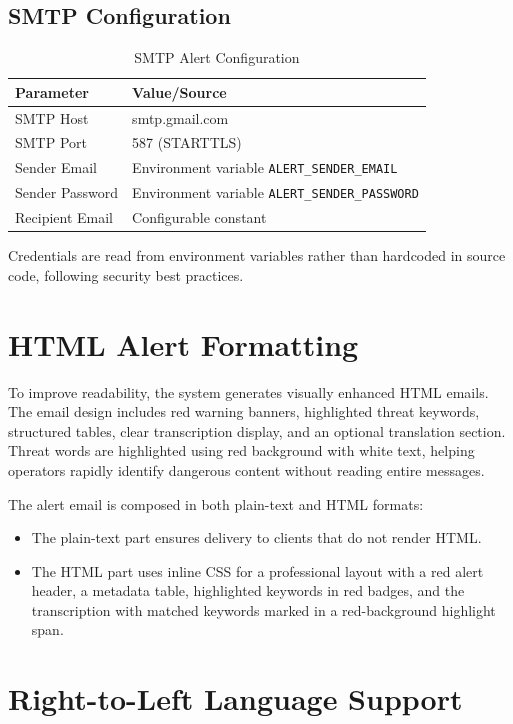 \documentclass[12pt]{report}
\begin{document}
\subsection{SMTP Configuration}

\begin{table}[H]
\centering
\begin{tabular}{|l|l|}
\hline
\textbf{Parameter} & \textbf{Value/Source} \\
\hline
SMTP Host & smtp.gmail.com \\
\hline
SMTP Port & 587 (STARTTLS) \\
\hline
Sender Email & Environment variable \texttt{ALERT\_SENDER\_EMAIL} \\
\hline
Sender Password & Environment variable \texttt{ALERT\_SENDER\_PASSWORD} \\
\hline
Recipient Email & Configurable constant \\
\hline
\end{tabular}
\caption{SMTP Alert Configuration}
\end{table}

\noindent Credentials are read from environment variables rather than hardcoded in source code, following security best practices.

\section{HTML Alert Formatting}

To improve readability, the system generates visually enhanced HTML emails. The email design includes red warning banners, highlighted threat keywords, structured tables, clear transcription display, and an optional translation section. Threat words are highlighted using red background with white text, helping operators rapidly identify dangerous content without reading entire messages.

The alert email is composed in both plain-text and HTML formats:
\begin{itemize}
    \item The plain-text part ensures delivery to clients that do not render HTML.
    \item The HTML part uses inline CSS for a professional layout with a red alert header, a metadata table, highlighted keywords in red badges, and the transcription with matched keywords marked in a red-background highlight span.
\end{itemize}

\section{Right-to-Left Language Support}
\end{document}
